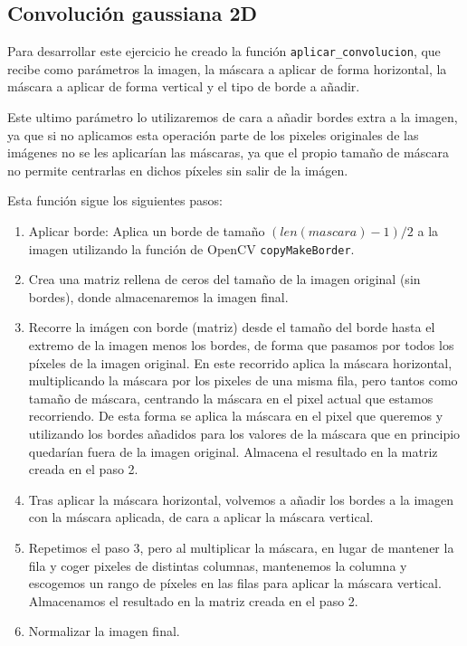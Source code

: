 \documentclass[12pt, spanish]{article}
\begin{document}
\subsection{Convolución gaussiana 2D}

Para desarrollar este ejercicio he creado la función \texttt{aplicar\_convolucion}, que recibe como parámetros la imagen, la máscara a aplicar de forma horizontal, la máscara a aplicar de forma vertical y el tipo de borde a añadir.

Este ultimo parámetro lo utilizaremos de cara a añadir bordes extra a la imagen, ya que si no aplicamos esta operación parte de los pixeles originales de las imágenes no se les aplicarían las máscaras, ya que el propio tamaño de máscara no permite centrarlas en dichos píxeles sin salir de la imágen.


Esta función sigue los siguientes pasos:

\begin{enumerate}
	\item Aplicar borde: Aplica un borde de tamaño $(len(mascara) - 1) / 2$ a la imagen utilizando la función de OpenCV \texttt{copyMakeBorder}.
	\item Crea una matriz rellena de ceros del tamaño de la imagen original (sin bordes), donde almacenaremos la imagen final.
	\item Recorre la imágen con borde (matriz) desde el tamaño del borde hasta el extremo de la imagen menos los bordes, de forma que pasamos por todos los píxeles de la imagen original. En este recorrido aplica la máscara horizontal, multiplicando la máscara por los pixeles de una misma fila, pero tantos como tamaño de máscara, centrando la máscara en el pixel actual que estamos recorriendo. De esta forma se aplica la máscara en el pixel que queremos y utilizando los bordes añadidos para los valores de la máscara que en principio quedarían fuera de la imagen original. Almacena el resultado en la matriz creada en el paso 2.
	\item Tras aplicar la máscara horizontal, volvemos a añadir los bordes a la imagen con la máscara aplicada, de cara a aplicar la máscara vertical.
	\item Repetimos el paso 3, pero al multiplicar la máscara, en lugar de mantener la fila y coger pixeles de distintas columnas, mantenemos la columna y escogemos un rango de píxeles en las filas para aplicar la máscara vertical. Almacenamos el resultado en la matriz creada en el paso 2.
	\item Normalizar la imagen final.
\end{enumerate}
\end{document}
